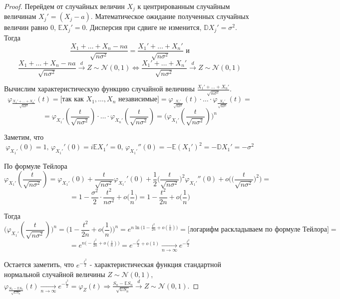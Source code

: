 \begin{proof}
    \text{}
    
    Перейдем от случайных величин $X_j$ к центрированным случайным величинам $X_j' = (X_j - a)$. Математическое ожидание полученных случайных величин равно 0, $\mathbb{E}X_j' = 0$. Дисперсия при сдвиге не изменится, $\mathbb{D}X_j' = \sigma^2$. Тогда
    $$\frac{X_1 + \ldots + X_n - na}{\sqrt{n\sigma^2}} = \frac{X_1' + \ldots + X_n'}{\sqrt{n\sigma^2}} \textrm{ и}$$
    $$\frac{X_1 + \ldots + X_n - na}{\sqrt{n\sigma^2}} \xrightarrow{d} Z \sim \mathcal{N}(0, 1) \Leftrightarrow \frac{X_1' + \ldots + X_n'}{\sqrt{n\sigma^2}} \xrightarrow{d} Z \sim \mathcal{N}(0, 1)$$
    
    Вычислим характеристическую функцию случайной величины $\frac{X_1' + \ldots + X_n'}{\sqrt{n\sigma^2}}$.
    $$\varphi_{\frac{X_1' + \ldots + X_n'}{\sqrt{n\sigma^2}}}(t) = \Big[ \textrm{так как } X_1, \ldots, X_n \textrm{ независимые} \Big] = \varphi_{\frac{X_1'}{\sqrt{n\sigma^2}}}(t) \cdot \ldots \cdot \varphi_{\frac{X_n'}{\sqrt{n\sigma^2}}}(t) =$$
    $$= \varphi_{X_1'}(\frac{t}{\sqrt{n\sigma^2}}) \cdot \ldots \cdot \varphi_{X_n'}(\frac{t}{\sqrt{n\sigma^2}}) = \Big( \varphi_{X_1'}(\frac{t}{\sqrt{n\sigma^2}}) \Big)^n$$
    
    Заметим, что
    $$\varphi_{X_1'}(0) = 1 \textrm{, } \varphi_{X_1'}'(0) = i\mathbb{E}X_1' = 0 \textrm{, } \varphi_{X_1'}''(0) = -\mathbb{E}(X_1')^2 = -\mathbb{D}X_1' = -\sigma^2$$
    
    По формуле Тейлора
    $$\varphi_{X_1'}(\frac{t}{\sqrt{n\sigma^2}}) = \varphi_{X_1'}(0) + \frac{t}{\sqrt{n\sigma^2}}\varphi_{X_1'}'(0) + \frac{1}{2}\big(\frac{t}{\sqrt{n\sigma^2}}\big)^2\varphi_{X_1'}''(0) + o\Big(\big(\frac{t}{\sqrt{n\sigma^2}}\big)^2\Big) =$$
    $$= 1 - \frac{\sigma^2}{2} \cdot \frac{t^2}{n\sigma^2} + o\big( \frac{1}{n} \big) = 1 - \frac{t^2}{2n} + o\big( \frac{1}{n} \big)$$
    
    Тогда
    $$\Big( \varphi_{X_1'}(\frac{t}{\sqrt{n\sigma^2}}) \Big)^n = \Big( 1 - \frac{t^2}{2n} + o\big( \frac{1}{n} \big) \Big)^n = e^{n \ln{\big( 1 - \frac{t^2}{2n} + o(\frac{1}{n}) \big)}} = \Big[ \textrm{логарифм раскладываем по формуле Тейлора} \Big] =$$
    $$= e^{n \big(-\frac{t^2}{2n} + o(\frac{1}{n}) \big)} = e^{-\frac{t^2}{2} + o(1)} \xrightarrow[n \rightarrow \infty]{} e^{-\frac{t^2}{2}}$$
    
    Остается заметить, что $e^{-\frac{t^2}{2}}$ - характеристическая функция стандартной нормальной случайной величины $Z \sim \mathcal{N}(0, 1)$, $\varphi_{\frac{S_n - \mathbb{E}S_n}{\sqrt{\mathbb{D}S_n}}}(t) \xrightarrow[n \rightarrow \infty]{} e^{-\frac{t^2}{2}} = \varphi_{Z}(t) \Rightarrow \frac{S_n - \mathbb{E}S_n}{\sqrt{\mathbb{D}S_n}} \xrightarrow{d} Z \sim \mathcal{N}(0, 1)$.
\end{proof}
